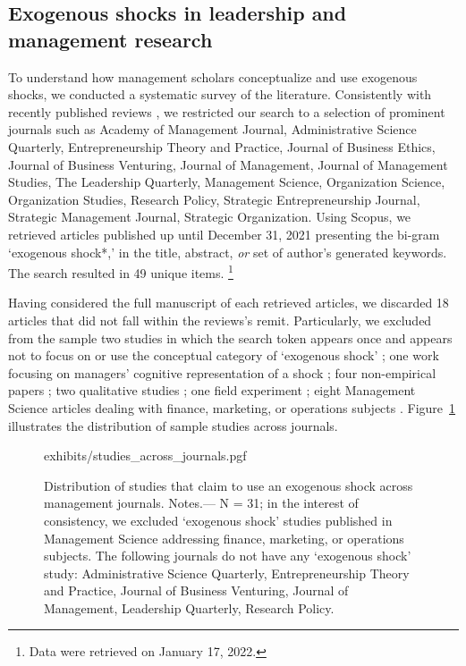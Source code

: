 \begin{refsection}
\subsection{Exogenous shocks in leadership and management research}
\label{subsec:exogenous_shocks_in_management}

\noindent To understand how management scholars conceptualize and use
exogenous shocks, we conducted a systematic survey of the literature. 
Consistently with recently published reviews 
\autocite[e.g.,][]{gonzalez_et_al_2018,rindova_et_al_2018}, we restricted our
search to a selection of prominent journals such as Academy of Management
Journal, Administrative Science Quarterly, Entrepreneurship Theory and Practice,
Journal of Business Ethics, Journal of Business Venturing, Journal of
Management, Journal of Management Studies, The Leadership Quarterly, Management
Science, Organization Science, Organization Studies, Research Policy, Strategic
Entrepreneurship Journal, Strategic Management Journal, Strategic Organization.
Using Scopus, we retrieved articles published up until December 31, 2021
presenting the bi-gram `exogenous shock*,' in the title, abstract, \emph{or} set of
author's generated keywords. The search resulted in 49 unique items.
\footnote{Data were retrieved on January 17, 2022.}

Having considered the full manuscript of each retrieved articles, we discarded
18 articles that did not fall within the reviews's remit. Particularly, 
we excluded from the sample two studies in which the search token appears once and 
appears not to focus on or use the conceptual category of `exogenous shock'
\autocite{uzzi199735,kriauciunas2006659}; one work focusing on managers'
cognitive representation of a shock \autocite{barreto2013687}; four non-empirical papers
\autocite[e.g.,][]{mcsweeney2009933}; two qualitative studies
\autocite{glynn20051031, jenkins2010884}; one field experiment 
\autocite{cui20191216}; eight Management Science articles dealing with 
finance, marketing, or operations subjects \autocite[e.g.,][]{tham20182901}.
Figure~\ref{fig:studies_across_journals} illustrates the distribution of sample
studies across journals.

\begin{figure}[!htbp]
    \centering
    {exhibits/studies_across_journals.pgf}
    \caption{Distribution of studies that claim to use an exogenous shock across
    management journals.  Notes.--- N = 31; in the interest of consistency, we
    excluded `exogenous shock' studies published in Management Science addressing
    finance, marketing, or operations subjects. The following journals do not have any
    `exogenous shock' study: Administrative Science Quarterly, Entrepreneurship
    Theory and Practice, Journal of Business Venturing, Journal of Management,
    Leadership Quarterly, Research Policy.}
    \label{fig:studies_across_journals}
\end{figure}         


\end{refsection}
